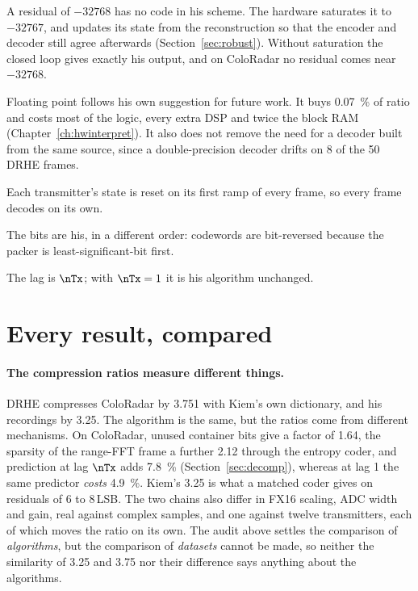 \begin{description}[leftmargin=!,labelwidth=6mm,style=sameline,font=\normalfont\bfseries]
\item[(a)] A residual of $-32768$ has no code in his scheme. The hardware
saturates it to $-32767$, and updates its state from the reconstruction so
that the encoder and decoder still agree afterwards (Section~\ref{sec:robust}).
Without saturation the closed loop gives exactly his output, and on ColoRadar
no residual comes near $-32768$.
\item[(b)] Floating point follows his own suggestion for future work. It buys
\SI{0.07}{\percent} of ratio and costs most of the logic, every extra DSP and
twice the block RAM (Chapter~\ref{ch:hwinterpret}). It also does not remove
the need for a decoder built from the same source, since a double-precision
decoder drifts on 8 of the 50 DRHE frames.
\item[(c)] Each transmitter's state is reset on its first ramp of every frame,
so every frame decodes on its own.
\item[(d)] The bits are his, in a different order: codewords are bit-reversed
because the packer is least-significant-bit first.
\item[(e)] The lag is $\nTx$; with $\nTx = 1$ it is his algorithm unchanged.
\end{description}

\section{Every result, compared}
\label{sec:kc_cr}

\paragraph{The compression ratios measure different things.} DRHE compresses
ColoRadar by 3.751 with Kiem's own dictionary, and his recordings by 3.25. The
algorithm is the same, but the ratios come from different mechanisms. On
ColoRadar, unused container bits give a factor of 1.64, the sparsity of the
range-FFT frame a further 2.12 through the entropy coder, and prediction at lag
$\nTx$ adds \SI{7.8}{\percent} (Section~\ref{sec:decomp}), whereas at lag 1 the
same predictor \emph{costs} \SI{4.9}{\percent}. Kiem's 3.25 is what a matched
coder gives on residuals of 6 to 8\,LSB. The two chains also differ in FX16
scaling, ADC width and gain, real against complex samples, and one against
twelve transmitters, each of which moves the ratio on its own. The audit above
settles the comparison of \emph{algorithms}, but the comparison of
\emph{datasets} cannot be made, so neither the similarity of 3.25 and 3.75 nor
their difference says anything about the algorithms.

